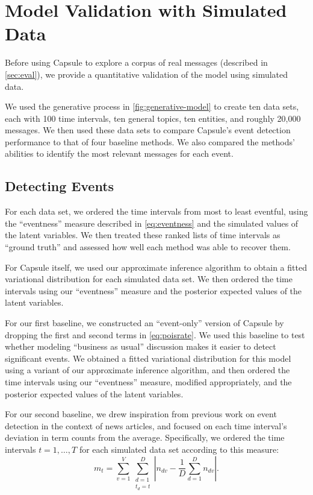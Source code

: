 
\section{Model Validation with Simulated Data}
\label{sec:valid}

Before using Capsule to explore a corpus of real messages (described
in \cref{sec:eval}), we provide a quantitative validation of the model
using simulated data.

We used the generative process in \cref{fig:generative-model} to
create ten data sets, each with 100 time intervals, ten general
topics, ten entities, and roughly 20,000 messages. We then used these
data sets to compare Capsule's event detection performance to that of
four baseline methods. We also compared the methods' abilities to
identify the most relevant messages for each event.

\subsection{Detecting Events}

For each data set, we ordered the time intervals from most to least
eventful, using the ``eventness'' measure described in
\cref{eq:eventness} and the simulated values of the latent
variables. We then treated these ranked lists of time intervals as
``ground truth'' and assessed how well each method was able to recover
them.

For Capsule itself, we used our approximate inference algorithm to
obtain a fitted variational distribution for each simulated data
set. We then ordered the time intervals using our ``eventness''
measure and the posterior expected values of the latent variables.

For our first baseline, we constructed an ``event-only'' version of
Capsule by dropping the first and second terms in
\cref{eq:poisrate}. We used this baseline to test whether modeling
``business as usual'' discussion makes it easier to detect significant
events. We obtained a fitted variational distribution for this model
using a variant of our approximate inference algorithm, and then
ordered the time intervals using our ``eventness'' measure, modified
appropriately, and the posterior expected values of the latent variables.

For our second baseline, we drew inspiration from previous work on
event detection in the context of news articles, and focused on each
time interval's deviation in term counts from the
average. Specifically, we ordered the time intervals $t=1, \ldots, T$
for each simulated data set according to this measure:
\begin{equation}
  m_t = \sum_{v=1}^V \sum_{\substack{d=1\\t_d \!=\! t}}^D \left\lvert n_{dv} - \frac{1}{D}\sum_{d=1}^D
  n_{dv} \right\rvert.
\label{eq:wordev}
\end{equation}

